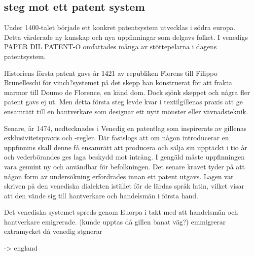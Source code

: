 
\subsection{steg mot ett patent system} %
\label{sub:steg_mot_ett_patent_system}
Under 1400-talet började ett konkret patentsystem utvecklas i södra europa. Detta värderade ny kunskap och nya uppfinningar som delgavs folket. I venedigs PAPER DIL PATENT-O omfattades många av stöttepelarna i dagens patentsystem. 

Historiens första patent gavs år 1421 av republiken Florens till Filippo Brunelleschi för vinch?systemet på det skepp han konstruerat för att frakta marmor till Doumo de Florence, en känd dom. Dock sjönk skeppet och några fler patent gavs ej ut. Men detta första steg levde kvar i textilgillenas praxis att ge ensamrätt till en hantverkare som designar ett nytt mönster eller vävnadsteknik. 

Senare, år 1474, nedtecknades i Venedig en patentlag som inspirerats av gillenas exklusivitetspraxis och -regler. Där fastslogs att om någon introducerar en uppfinnins skall denne få ensamrätt att producera och sälja sin upptäckt i tio år och vederbörandes ges laga beskydd mot intrång. I gengäld måste uppfinningen vara genuint ny och användbar för befolkningen. Det senare kravet tyder på att någon form av undersökning erfordrades innan ett patent utgavs. Lagen var skriven på den venediska dialekten istället för de lärdas språk latin, vilket visar att den vände sig till hantverkare och handelsmän i första hand.

Det venediska systemet spreds genom Euorpa i takt med att handelsmän och hantverkare emigrerade. (kunde upptas då gillen banat väg?) emmigrerar extramycket då venedig stgnerar

-> england




